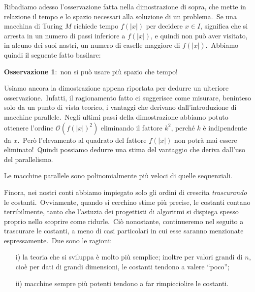 Ribadiamo adesso l'osservazione fatta nella dimostrazione di sopra, che mette in relazione il tempo e lo spazio necessari alla soluzione di un problema.\
Se una macchina di Turing $M$ richiede tempo $f(|x|)$ per decidere $x \in I$, significa che si arresta in un numero di passi inferiore a $f(|x|)$, e quindi non può aver visitato, in alcuno dei suoi nastri, un numero di caselle maggiore di $f(|x|)$.\
Abbiamo quindi il seguente fatto basilare:

\begin{center}
    \textbf{Osservazione 1}:\ non si può usare più spazio che tempo!
\end{center}

\noindent Usiamo ancora la dimostrazione appena riportata per dedurre un ulteriore osservazione.\
Infatti, il ragionamento fatto ci suggerisce come misurare, beninteso solo da un punto di vista teorico, i vantaggi che derivano dall'introduzione di macchine parallele.\
Negli ultimi passi della dimostrazione abbiamo potuto ottenere l'ordine $\mathcal{O}(f(|x|)^2)$ eliminando il fattore $k^2$, perché $k$ è indipendente da $x$.\
Però l'elevamento al quadrato del fattore $f(|x|)$ non potrà mai essere eliminato!\
Quindi possiamo dedurre una stima del vantaggio che deriva dall'uso del parallelismo.

\begin{corollario}
    Le macchine parallele sono polinomialmente più veloci di quelle sequenziali.
\end{corollario}

\noindent Finora, nei nostri conti abbiamo impiegato solo gli ordini di crescita \textit{trascurando} le costanti.\
Ovviamente, quando si cerchino stime più precise, le costanti contano terribilmente, tanto che l'astuzia dei progettisti di algoritmi si dispiega spesso proprio nello scoprire come ridurle.\
Ciò nonostante, continueremo nel seguito a trascurare le costanti, a meno di casi particolari in cui esse saranno menzionate espressamente.\
Due sono le ragioni:
\begin{itemize}
    \item[i)] la teoria che si sviluppa è molto più semplice; inoltre per valori grandi di $n$, cioè per dati di grandi dimensioni, le costanti tendono a valere ``poco'';
    \item[ii)] macchine sempre più potenti tendono a far rimpicciolire le costanti.
\end{itemize}

